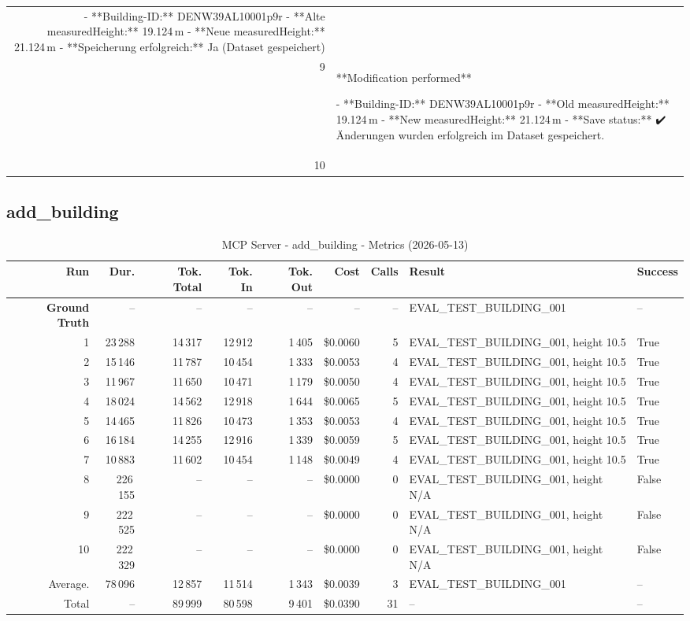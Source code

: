 \documentclass[a4paper,11pt]{article}
\begin{document}
\begin{table}[ht]
\begin{tabular}{r p{12cm}}
- **Building-ID:** DENW39AL10001p9r  
- **Alte measuredHeight:** 19.124 m  
- **Neue measuredHeight:** 21.124 m  
- **Speicherung erfolgreich:** Ja (Dataset gespeichert) \\
9 & **Modification performed**

- **Building-ID:** DENW39AL10001p9r  
- **Old measuredHeight:** 19.124 m  
- **New measuredHeight:** 21.124 m  
- **Save status:** ✔️ Änderungen wurden erfolgreich im Dataset gespeichert. \\
10 &  \\
\hline
\end{tabular}
\end{table}

\clearpage
\subsection{add\_building}

\begin{table}[ht]
\centering
\scriptsize
\caption{MCP Server - add\_building - Metrics (2026-05-13)}
\label{tab:mcp\_add\_building\_metrics\_2026-05-13}
\begin{tabular}{r r r r r r r p{3cm} l}
\hline
Run & Dur. & Tok. Total & Tok. In & Tok. Out & Cost & Calls & Result & Success \\
\hline
\textbf{Ground Truth} & -- & -- & -- & -- & -- & -- & EVAL\_TEST\_BUILDING\_001 & -- \\
\hline
1 & 23\,288 & 14\,317 & 12\,912 & 1\,405 & \$0.0060 & 5 & EVAL\_TEST\_BUILDING\_001, height 10.5 & True \\
2 & 15\,146 & 11\,787 & 10\,454 & 1\,333 & \$0.0053 & 4 & EVAL\_TEST\_BUILDING\_001, height 10.5 & True \\
3 & 11\,967 & 11\,650 & 10\,471 & 1\,179 & \$0.0050 & 4 & EVAL\_TEST\_BUILDING\_001, height 10.5 & True \\
4 & 18\,024 & 14\,562 & 12\,918 & 1\,644 & \$0.0065 & 5 & EVAL\_TEST\_BUILDING\_001, height 10.5 & True \\
5 & 14\,465 & 11\,826 & 10\,473 & 1\,353 & \$0.0053 & 4 & EVAL\_TEST\_BUILDING\_001, height 10.5 & True \\
6 & 16\,184 & 14\,255 & 12\,916 & 1\,339 & \$0.0059 & 5 & EVAL\_TEST\_BUILDING\_001, height 10.5 & True \\
7 & 10\,883 & 11\,602 & 10\,454 & 1\,148 & \$0.0049 & 4 & EVAL\_TEST\_BUILDING\_001, height 10.5 & True \\
8 & 226\,155 & -- & -- & -- & \$0.0000 & 0 & EVAL\_TEST\_BUILDING\_001, height N/A & False \\
9 & 222\,525 & -- & -- & -- & \$0.0000 & 0 & EVAL\_TEST\_BUILDING\_001, height N/A & False \\
10 & 222\,329 & -- & -- & -- & \$0.0000 & 0 & EVAL\_TEST\_BUILDING\_001, height N/A & False \\
\hline
Average. & 78\,096 & 12\,857 & 11\,514 & 1\,343 & \$0.0039 & 3 & EVAL\_TEST\_BUILDING\_001 & -- \\
Total & -- & 89\,999 & 80\,598 & 9\,401 & \$0.0390 & 31 & -- & -- \\
\hline
\end{tabular}
\end{table}
\end{document}
